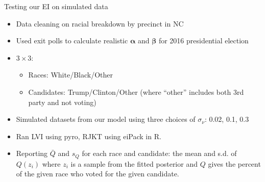 \documentclass[
  ignorenonframetext,
]{beamer}
\providecommand{\tightlist}{%
  \setlength{\itemsep}{0pt}\setlength{\parskip}{0pt}}
\begin{document}
\begin{frame}{Testing our EI on simulated data}
\protect\hypertarget{testing-our-ei-on-simulated-data}{}

\begin{itemize}
\tightlist
\item
  Data cleaning on racial breakdown by precinct in NC
\item
  Used exit polls to calculate realistic \(\bm{\alpha}\) and
  \(\bm{\beta}\) for 2016 presidential election
\item
  \(3\times 3\):

  \begin{itemize}
  \tightlist
  \item
    Races: White/Black/Other
  \item
    Candidates: Trump/Clinton/Other (where ``other'' includes both 3rd
    party and not voting)
  \end{itemize}
\item
  Simulated datasets from our model using three choices of
  \(\sigma_\nu\): 0.02, 0.1, 0.3
\item
  Ran LVI using pyro, RJKT using eiPack in R.
\item
  Reporting \(\bar{Q}\) and \(s_Q\) for each race and candidate: the
  mean and s.d. of \(Q(z_i)\) where \(z_i\) is a sample from the fitted
  posterior and \(Q\) gives the percent of the given race who voted for
  the given candidate.
\end{itemize}

\end{frame}
\end{document}
